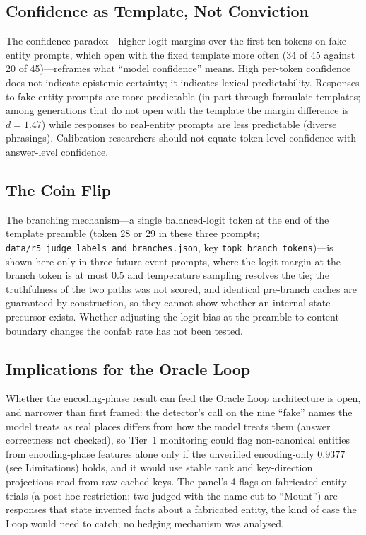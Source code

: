 \documentclass[11pt,a4paper]{article}
\begin{document}
\subsection{Confidence as Template, Not Conviction}

The confidence paradox---higher logit margins over the first ten tokens
on fake-entity prompts, which open with the fixed template more often (34
of 45 against 20 of 45)---reframes what ``model confidence'' means. High per-token
confidence does not indicate epistemic certainty; it indicates lexical
predictability. Responses to fake-entity prompts are more predictable (in part through formulaic templates; among generations that do not open with the template the margin difference is $d{=}1.47$) while responses to real-entity prompts are
less predictable (diverse phrasings). Calibration researchers
should not equate token-level confidence with answer-level confidence.

\subsection{The Coin Flip}

The branching mechanism---a single balanced-logit token at the end of the
template preamble (token 28 or 29 in these three prompts; \texttt{data/r5\_judge\_labels\_and\_branches.json}, key \texttt{topk\_\allowbreak branch\_\allowbreak tokens})---is shown here only in three future-event prompts, where the logit margin at the branch token is at most $0.5$ and temperature sampling resolves the tie; the truthfulness of the two paths was not scored, and identical pre-branch caches are guaranteed by construction, so they cannot show whether an internal-state precursor exists. Whether adjusting the logit bias at the preamble-to-content boundary changes the confab rate has not been tested.

\subsection{Implications for the Oracle Loop}

Whether the encoding-phase result can feed the Oracle Loop architecture
\citep{lyra2026oracleloop} is open, and narrower than first framed: the
detector's call on the nine ``fake''
names the model treats as real places differs from how the model treats them (answer correctness not checked), so Tier~1 monitoring could flag non-canonical
entities from encoding-phase features alone only if the unverified
encoding-only $0.9377$ (see Limitations) holds, and it would use stable
rank and key-direction projections read from raw cached keys. The panel's 4 flags on fabricated-entity trials (a post-hoc restriction; two judged with the name cut to ``Mount'') are
responses that state invented facts about a fabricated entity, the kind
of case the Loop would need to catch; no hedging mechanism was analysed.
\end{document}
